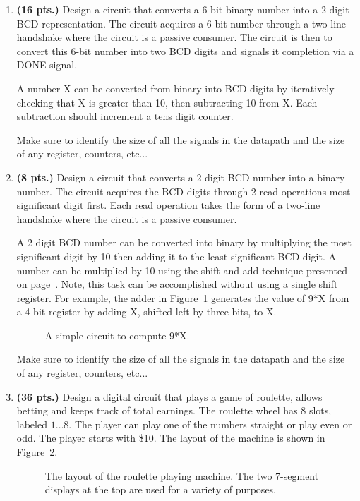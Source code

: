 \begin{enumerate}
\item \textbf{ (16 pts.)} Design a circuit that converts a 6-bit binary number into a 2 
digit BCD representation.  The circuit acquires a 6-bit number through
a two-line handshake where the circuit is a passive consumer.  The 
circuit is then to convert this 6-bit number into two BCD digits and
signals it completion via a DONE signal.

A number X can be converted from binary into BCD digits by iteratively
checking that X is greater than 10, then subtracting 10 from X.  Each
subtraction should increment a tens digit counter.

Make sure to identify the size of all the signals in the datapath
and the size of any register, counters, etc...
 
\item \textbf{ (8 pts.)}
Design a circuit that converts a 2 digit BCD number into a
binary number.  The circuit acquires the BCD digits through 2 read
operations most significant digit first.  Each read operation takes 
the form of a two-line handshake where the circuit is a passive 
consumer.

A 2 digit BCD number can be converted into binary by multiplying the
most significant digit by 10 then adding it to the least significant
BCD digit.  A number can be multiplied by 10 using the shift-and-add
technique presented on page~\pageref{page:MulyBy10}.  Note, this
task can be accomplished without using a single shift register.
For example, the adder in Figure~\ref{fig:NineTimes} generates the value
of 9*X from a 4-bit register by adding X, shifted left by three bits, to X.

\begin{figure}[ht]
\caption{A simple circuit to compute 9*X.}
\label{fig:NineTimes}
\end{figure}

Make sure to identify the size of all the signals in the datapath
and the size of any register, counters, etc...
 
\item \textbf{ (36 pts.)}
Design a digital circuit that plays a game of
roulette, allows betting and keeps track of total earnings.
The roulette wheel has 8 slots, labeled $1 \ldots 8$.  The player
can play one of the numbers straight or play even or odd.
The player starts with \$10. 
The layout of the machine is shown in Figure~\ref{fig:Roulette}.
\begin{figure}[ht]
\caption{The layout of the roulette playing machine.  
The two 7-segment displays at the top are used for a variety
of purposes.}
\label{fig:Roulette}
\end{figure}


\end{enumerate}
